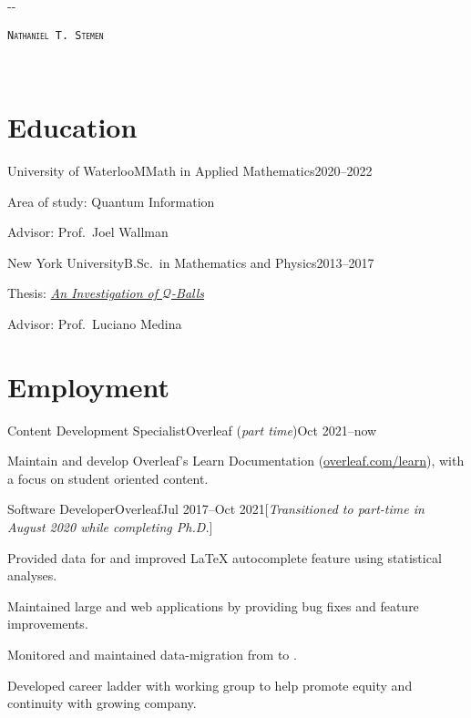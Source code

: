\documentclass{cultvoucher}
\begin{document}
\begin{adjustwidth}{\dimexpr-\marginparsep-\marginparwidth}{}
	\begin{center}
		\textsc{\texttt{\HUGE Nathaniel T. Stemen}}

		 \separator{}\, 
	\end{center}
\end{adjustwidth}

\section{Education}

\begin{entry}{University of Waterloo}{MMath in Applied Mathematics}{2020--2022}
	\item Area of study: Quantum Information
	\item Advisor: Prof.\ Joel Wallman
\end{entry}

\begin{entry}{New York University}{B.Sc.\ in Mathematics and Physics}{2013--2017}
	\item Thesis: \href{https://natestemen.xyz/qv-thesis.pdf}{\textit{An Investigation of $\mathcal{Q}$-Balls}}
	\item Advisor: Prof.\ Luciano Medina
\end{entry}

\section{Employment}
\begin{entry}{Content Development Specialist}{Overleaf (\emph{part time})}{Oct 2021--now}
	\item Maintain and develop Overleaf's Learn Documentation (\url{overleaf.com/learn}), with a focus on student oriented content.
\end{entry}

\begin{entry}{Software Developer}{Overleaf}{Jul 2017--Oct 2021}[\emph{Transitioned to part-time in August 2020 while completing Ph.D.}]
	\item Provided data for and improved \LaTeX{} autocomplete feature using statistical analyses.
	\item Maintained large  and  web applications by providing bug fixes and feature improvements.
	\item Monitored and maintained data-migration from  to .
	\item Developed career ladder with working group to help promote equity and continuity with growing company.
\end{entry}
\end{document}
